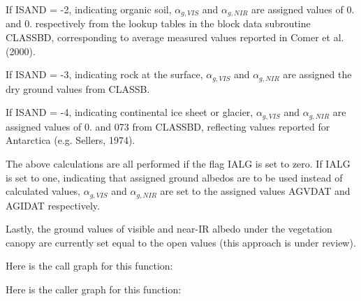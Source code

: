 If I\+S\+A\+N\+D = -\/2, indicating organic soil, $\alpha_{g,VIS}$ and $\alpha_{g,NIR}$ are assigned values of 0. and 0. respectively from the lookup tables in the block data subroutine C\+L\+A\+S\+S\+B\+D, corresponding to average measured values reported in Comer et al. (2000).

If I\+S\+A\+N\+D = -\/3, indicating rock at the surface, $\alpha_{g,VIS}$ and $\alpha_{g,NIR}$ are assigned the dry ground values from C\+L\+A\+S\+S\+B.

If I\+S\+A\+N\+D = -\/4, indicating continental ice sheet or glacier, $\alpha_{g,VIS}$ and $\alpha_{g,NIR}$ are assigned values of 0. and 073 from C\+L\+A\+S\+S\+B\+D, reflecting values reported for Antarctica (e.\+g. Sellers, 1974).

The above calculations are all performed if the flag I\+A\+L\+G is set to zero. If I\+A\+L\+G is set to one, indicating that assigned ground albedos are to be used instead of calculated values, $\alpha_{g,VIS}$ and $\alpha_{g,NIR}$ are set to the assigned values A\+G\+V\+D\+A\+T and A\+G\+I\+D\+A\+T respectively.

Lastly, the ground values of visible and near-\/\+I\+R albedo under the vegetation canopy are currently set equal to the open values (this approach is under review).

Here is the call graph for this function\+:




Here is the caller graph for this function\+:


